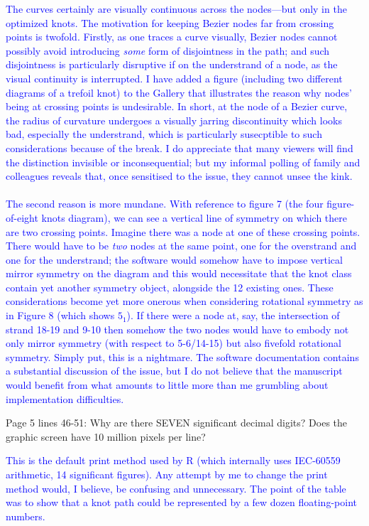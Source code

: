 \documentclass[12pt]{article}
\begin{document}
\textcolor{blue}{The curves certainly are visually continuous across
  the nodes---but only in the optimized knots.  The motivation for
  keeping Bezier nodes far from crossing points is twofold.  Firstly,
  as one traces a curve visually, Bezier nodes cannot possibly avoid
  introducing {\em some} form of disjointness in the path; and such
  disjointness is particularly disruptive if on the understrand of a
  node, as the visual continuity is interrupted.  I have added a
  figure (including two different diagrams of a trefoil knot) to the
  Gallery that illustrates the reason why nodes' being at crossing
  points is undesirable.  In short, at the node of a Bezier curve, the
  radius of curvature undergoes a visually jarring discontinuity which
  looks bad, especially the understrand, which is particularly
  susecptible to such considerations because of the break.  I do
  appreciate that many viewers will find the distinction invisible or
  inconsequential; but my informal polling of family and colleagues
  reveals that, once sensitised to the issue, they cannot unsee the
  kink.  \\ \\ The second reason is more mundane.  With reference to
  figure 7 (the four figure-of-eight knots diagram), we can see a
  vertical line of symmetry on which there are two crossing points.
  Imagine there was a node at one of these crossing points.  There
  would have to be {\em two} nodes at the same point, one for the
  overstrand and one for the understrand; the software would somehow
  have to impose vertical mirror symmetry on the diagram and this
  would necessitate that the knot class contain yet another symmetry
  object, alongside the 12 existing ones.  These considerations become
  yet more onerous when considering rotational symmetry as in Figure 8
  (which shows $5_1$).  If there were a node at, say, the intersection
  of strand 18-19 and 9-10 then somehow the two nodes would have to
  embody not only mirror symmetry (with respect to 5-6/14-15) but also
  fivefold rotational symmetry.  Simply put, this is a nightmare.  The
  software documentation contains a substantial discussion of the
  issue, but I do not believe that the manuscript would benefit from
  what amounts to little more than me grumbling about implementation
  difficulties.}

Page 5 lines 46-51: Why are there SEVEN significant decimal digits?
Does the graphic screen have 10 million pixels per line?

\textcolor{blue}{This is the default print method used by R (which
  internally uses IEC-60559 arithmetic, 14 significant figures).  Any
  attempt by me to change the print method would, I believe, be
  confusing and unnecessary.  The point of the table was to show that
  a knot path could be represented by a few dozen floating-point
  numbers.}
\end{document}

